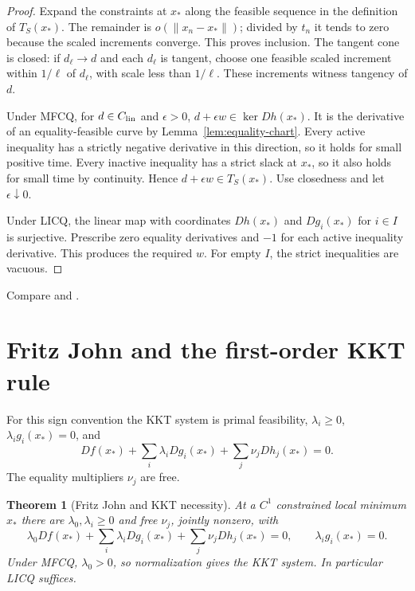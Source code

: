 \documentclass[11pt,oneside,openany]{book}
\theoremstyle{plain}
\newtheorem{theorem}{Theorem}[chapter]
\theoremstyle{definition}
\theoremstyle{remark}
\begin{document}
\begin{proof}
Expand the constraints at \(x_*\) along the
feasible sequence in the definition of \(T_S(x_*)\).
The remainder is \(o(\|x_n-x_*\|)\); divided by
\(t_n\) it tends to zero because the scaled
increments converge. This proves inclusion.
The tangent cone is closed: if \(d_\ell\to d\)
and each \(d_\ell\) is tangent, choose one
feasible scaled increment within \(1/\ell\) of
\(d_\ell\), with scale less than \(1/\ell\).
These increments witness tangency of \(d\).

Under MFCQ, for \(d\in C_{\rm lin}\) and
\(\epsilon>0\), \(d+\epsilon w\in\ker Dh(x_*)\).
It is the derivative of an equality-feasible
curve by Lemma~\ref{lem:equality-chart}.
Every active inequality has a strictly negative
derivative in this direction, so it holds for
small positive time. Every inactive inequality
has a strict slack at \(x_*\), so it also holds
for small time by continuity.
Hence \(d+\epsilon w\in T_S(x_*)\).
Use closedness and let \(\epsilon\downarrow0\).

Under LICQ, the linear map with coordinates
\(Dh(x_*)\) and \(Dg_i(x_*)\) for \(i\in I\)
is surjective. Prescribe zero equality derivatives
and \(-1\) for each active inequality derivative.
This produces the required \(w\). For empty
\(I\), the strict inequalities are vacuous.
\end{proof}

Compare \cite[Definitions 12.1 and 12.5 and
Sections 12.3 and 12.6]{NocedalWright} and
\cite[Section 3]{MangasarianFromovitz}.

\section{Fritz John and the first-order KKT rule}
\label{v06-04}

For this sign convention the KKT system is
primal feasibility, \(\lambda_i\ge0\),
\(\lambda_i g_i(x_*)=0\), and
\[
 Df(x_*)+\sum_i\lambda_iDg_i(x_*)+
                    \sum_j\nu_jDh_j(x_*)=0 .
\]
The equality multipliers \(\nu_j\) are free.

\begin{theorem}[Fritz John and KKT necessity]\label{thm:fritz-john}
At a \(C^1\) constrained local minimum \(x_*\)
there are \(\lambda_0,\lambda_i\ge0\) and free
\(\nu_j\), jointly nonzero, with
\[
 \lambda_0 Df(x_*)+\sum_i\lambda_iDg_i(x_*)+
                       \sum_j\nu_jDh_j(x_*)=0,
 \qquad \lambda_i g_i(x_*)=0.
\]
Under MFCQ, \(\lambda_0>0\), so normalization gives
the KKT system. In particular LICQ suffices.
\end{theorem}
\end{document}
